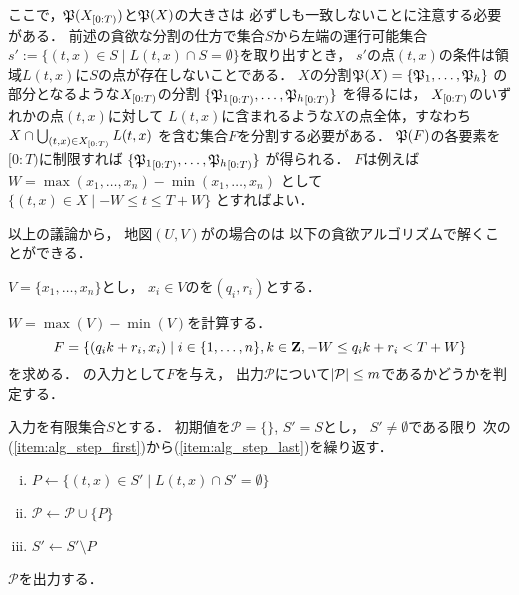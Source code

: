 ここで，$\mathfrak{P}({X}_{[0:T)})$と$\mathfrak{P}(X)$の大きさは
必ずしも一致しないことに注意する必要がある．
前述の貪欲な分割の仕方で集合$S$から左端の運行可能集合
$s' := \{ (t, x) \in S \mid L(t, x) \cap S = \emptyset \}$を取り出すとき，
$s'$の点$(t, x)$の条件は領域$L(t, x)$に$S$の点が存在しないことである．
$X$の分割$\mathfrak{P}(X) = \{ \mathfrak{P}_1, \ldots, \mathfrak{P}_h \}$%
の部分となるような${X}_{[0:T)}$の分割
$\{ {\mathfrak{P}_1}_{[0:T)}, \ldots, {\mathfrak{P}_h}_{[0:T)} \}$
を得るには，
${X}_{[0:T)}$のいずれかの点$(t, x)$に対して
$L(t, x)$に含まれるような$X$の点全体，すなわち
$X \cap \bigcup_{(t, x) \in {X}_{[0:T)}}L(t, x)$%
を含む集合$F$を分割する必要がある．
$\mathfrak{P}(F)$の各要素を$[0:T)$に制限すれば
$\{ {\mathfrak{P}_1}_{[0:T)}, \ldots, {\mathfrak{P}_h}_{[0:T)} \}$%
が得られる．
$F$は例えば
$W = \max(x_1, \ldots, x_n) - \min(x_1, \ldots, x_n)$%
として
$\{ (t, x) \in X \mid -W \leq t \leq T + W \}$%
とすればよい．


以上の議論から，
地図$(U, V)$が{\graphLine}の場合の{\timeSpecifiedPP}は
以下の貪欲アルゴリズムで解くことができる．

$V = \{ x_1, \ldots, x_n \}$とし，
$x_i \in V$の{\exactTime}を$(q_i, r_i)$とする．

$W = \max(V) - \min(V)$を計算する．
%
\[
  F = \{ (q_i k + r_i, x_i) \mid
    i \in \{ 1, \ldots, n \},
    k \in \mathbf Z, -W \leq q_i k + r_i < T + W \}
\]
を求める．
{\setPartAlgo}の入力として$F$を与え，
出力$\mathcal{P}$について$\lvert{\mathcal{P}}\rvert \leq m$であるかどうかを判定する．

\begin{setPartitionAlgorithm}
  入力を有限集合$S$とする．
  初期値を$\mathcal{P} = \{\}$, $S' = S$とし，
  $S' \neq \emptyset$である限り
  次の(\ref{item:alg_step_first})から(\ref{item:alg_step_last})を繰り返す．
  \begin{enumerate}[(i)]
  \item \label{item:alg_step_first}
    $P \gets \{ (t, x) \in S' \mid L(t, x) \cap S' = \emptyset \}$
  \item
    $\mathcal{P} \gets \mathcal{P} \cup \{ P \}$
  \item \label{item:alg_step_last}
    $S' \gets S' \setminus P$
  \end{enumerate}
  $\mathcal{P}$を出力する．
\end{setPartitionAlgorithm}


